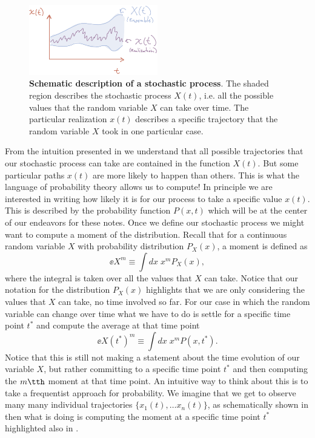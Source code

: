 \begin{figure}[h!]
	\centering \includegraphics[width=0.5\textwidth]
  {../fig/drift_langevin/01_00001.jpeg}
	\caption{\textbf{Schematic description of a stochastic process}. The shaded
	region describes the stochastic process $X(t)$, i.e. all the possible values
	that the random variable $X$ can take over time. The particular realization
	$x(t)$ describes a specific trajectory that the random variable $X$ took in
	one particular case.}
  \label{fig01_00001}
\end{figure}

From the intuition presented in  we understand that all
possible trajectories that our stochastic process can take are contained in the
function $X(t)$. But some particular paths $x(t)$ are more likely to happen
than others. This is what the language of probability theory allows us to
compute! In principle we are interested in writing how likely it is for our
process to take a specific value $x(t)$. This is described by the probability
function $P(x, t)$ which will be at the center of our endeavors for these
notes. Once we define our stochastic process we might want to compute a moment
of the distribution. Recall that for a continuous random variable $X$ with
probability distribution $P_X(x)$, a moment is defined as
\begin{equation}
  \ee{X^m} \equiv \int dx \; x^m P_X(x),
\end{equation}
where the integral is taken over all the values that $X$ can take. Notice that
our notation for the distribution $P_X(x)$ highlights that we are only
considering the values that $X$ can take, no time involved so far. For our case
in which the random variable can change over time what we have to do is settle
for a specific time point $t^*$ and compute the average at that time point
\begin{equation}
  \ee{X(t^*)^m} \equiv \int dx \; x^m P(x, t^*).
  \label{eq_process_moment}
\end{equation}
Notice that this is still not making a statement about the time evolution of
our variable $X$, but rather committing to a specific time point $t^*$ and then
computing the $m\tth$ moment at that time point. An intuitive way to think
about this is to take a frequentist approach for probability. We imagine that
we get to observe many many individual trajectories $\{x_1(t), \ldots
x_n(t)\}$, as schematically shown in  then what
 is doing is computing the moment at a specific time
point $t^*$ highlighted also in .

